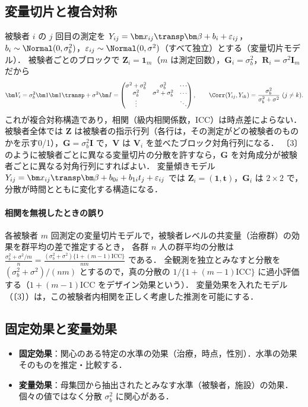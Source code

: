 \subsection{変量切片と複合対称}\label{subsec:08-ri}
\Hissu 被験者 $i$ の $j$ 回目の測定を $Y_{ij}=\bm x_{ij}\transp\bm\beta+b_i+\varepsilon_{ij}$，$b_i\sim\Normal(0,\sigma_b^2)$，$\varepsilon_{ij}\sim\Normal(0,\sigma^2)$（すべて独立）とする（変量切片モデル）．
被験者ごとのブロックで $\bm Z_i=\bm 1_{m}$（$m$ は測定回数），$\bm G_i=\sigma_b^2$，$\bm R_i=\sigma^2\bm I_m$ だから
\[
\bm V_i=\sigma_b^2\bm 1\bm 1\transp+\sigma^2\bm I=
\begin{pmatrix}\sigma^2+\sigma_b^2&\sigma_b^2&\cdots\\ \sigma_b^2&\sigma^2+\sigma_b^2&\cdots\\ \vdots&&\ddots\end{pmatrix},
\qquad \Corr(Y_{ij},Y_{ik})=\frac{\sigma_b^2}{\sigma_b^2+\sigma^2}\ (j\ne k).
\]
これが複合対称構造であり，相関（級内相関係数，ICC）は時点差によらない．
被験者全体では $\bm Z$ は被験者の指示行列（各行は，その測定がどの被験者のものかを示す0/1），$\bm G=\sigma_b^2\bm I$ で，$\bm V$ は $\bm V_i$ を並べたブロック対角行列になる．
〔3〕のように被験者ごとに異なる変量切片の分散を許すなら，$\bm G$ を対角成分が被験者ごとに異なる対角行列にすればよい．
変量傾きモデル $Y_{ij}=\bm x_{ij}\transp\bm\beta+b_{0i}+b_{1i}t_j+\varepsilon_{ij}$ では $\bm Z_i=(\bm1,\bm t)$，$\bm G_i$ は $2\times2$ で，分散が時間とともに変化する構造になる．

\paragraph{相関を無視したときの誤り}
各被験者 $m$ 回測定の変量切片モデルで，被験者レベルの共変量（治療群）の効果を群平均の差で推定するとき，
各群 $n$ 人の群平均の分散は $\frac{\sigma_b^2+\sigma^2/m}{n}=\frac{(\sigma_b^2+\sigma^2)\{1+(m-1)\mathrm{ICC}\}}{nm}$ である．
全観測を独立とみなすと分散を $(\sigma_b^2+\sigma^2)/(nm)$ とするので，真の分散の $1/\{1+(m-1)\mathrm{ICC}\}$ に過小評価する（$1+(m-1)\mathrm{ICC}$ をデザイン効果という）．
変量効果を入れたモデル（〔3〕）は，この被験者内相関を正しく考慮した推測を可能にする．

\subsection{固定効果と変量効果}\label{subsec:08-fixrand}
\begin{itemize}
\item \textbf{固定効果}：関心のある特定の水準の効果（治療，時点，性別）．水準の効果そのものを推定・比較する．
\item \textbf{変量効果}：母集団から抽出されたとみなす水準（被験者，施設）の効果．個々の値ではなく分散 $\sigma_b^2$ に関心がある．
\end{itemize}

